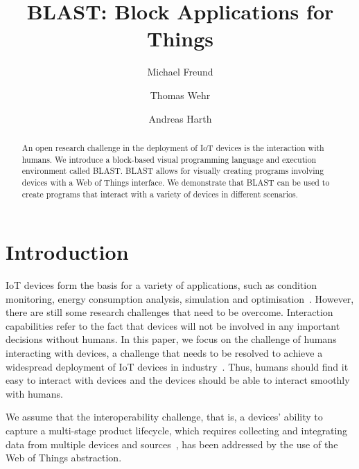 \documentclass[runningheads]{llncs}
\begin{document}
%
\title{BLAST: Block Applications for Things}
%
%
\author{Michael Freund \and
Thomas Wehr \and
Andreas Harth}
%
%
%
\maketitle              %
%
\begin{abstract}
  An open research challenge in the deployment of IoT devices is the interaction with humans.
  We introduce a block-based visual programming language and execution environment called BLAST.
  BLAST allows for visually creating programs involving devices with a Web of Things interface.
  We demonstrate that BLAST can be used to create programs that interact with a variety of devices in different scenarios.
\end{abstract}
%
%
%
\setcounter{footnote}{0}
\section{Introduction}
IoT devices form the basis for a variety of applications, such as condition monitoring, energy consumption analysis, simulation and optimisation~\cite{CIMINO2019103130}.
However, there are still some research challenges that need to be overcome.
Interaction capabilities refer to the fact that devices will not be involved in any important decisions without humans.
In this paper, we focus on the challenge of humans interacting with devices, a challenge that needs to be resolved to achieve a widespread deployment of IoT devices in industry~\cite{KUEHNER20211227}.
Thus, humans should find it easy to interact with devices and the devices should be able to interact smoothly with humans.

We assume that the interoperability challenge, that is, a devices' ability to capture a multi-stage product lifecycle, which requires collecting and integrating data from multiple devices and sources~\cite{SEMERARO2021103469}, has been addressed by the use of the Web of Things abstraction.
\end{document}
